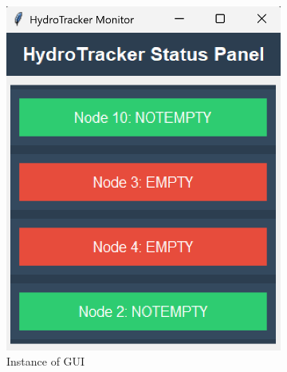 \begin{figure}[H]
    \centering
    \begin{subfigure}[b]{0.4\linewidth}
        \centering
        \includegraphics[width=\linewidth]{assets/gui_images/gui_screenshot_1.png}
        \caption{Instance of GUI}
        \label{fig:subfig1}
    \end{subfigure}
    \hfill
    \begin{subfigure}[b]{0.4\linewidth}
        \centering

\end{subfigure}
\end{figure}
